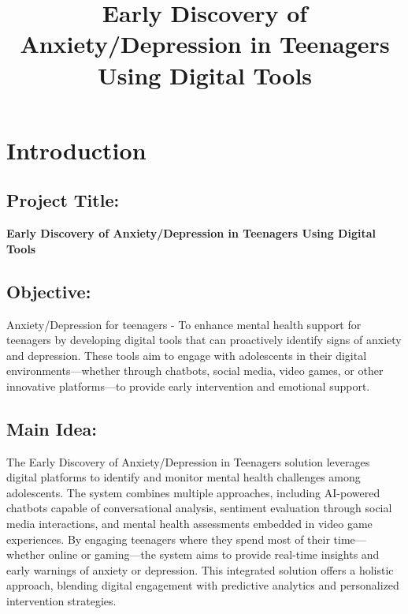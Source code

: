 \documentclass[a4paper,12pt]{article}
\title{Early Discovery of Anxiety/Depression in Teenagers Using Digital Tools}
\author{}
\date{}
\begin{document}
\maketitle


\vspace{0.5cm} %

\section{Introduction}

\subsection{Project Title:}
\textbf{Early Discovery of Anxiety/Depression in Teenagers Using Digital Tools}

\vspace{0.5cm} %

\subsection{Objective:}
Anxiety/Depression for teenagers - To enhance mental health support for teenagers by developing digital tools that can proactively identify signs of anxiety and depression. These tools aim to engage with adolescents in their digital environments—whether through chatbots, social media, video games, or other innovative platforms—to provide early intervention and emotional support.

\vspace{0.5cm} %

\subsection{Main Idea:}
The Early Discovery of Anxiety/Depression in Teenagers solution leverages digital platforms to identify and monitor mental health challenges among adolescents. The system combines multiple approaches, including AI-powered chatbots capable of conversational analysis, sentiment evaluation through social media interactions, and mental health assessments embedded in video game experiences. By engaging teenagers where they spend most of their time—whether online or gaming—the system aims to provide real-time insights and early warnings of anxiety or depression. This integrated solution offers a holistic approach, blending digital engagement with predictive analytics and personalized intervention strategies.
\end{document}
